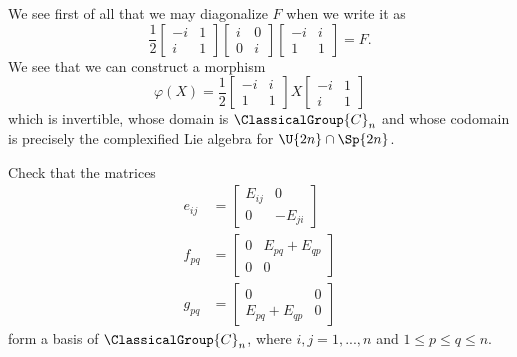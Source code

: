 \answer We see first of all that we may diagonalize $F$ when we
write it as
\begin{equation}
\frac{1}{2}\begin{bmatrix}-i&1\\i&1
\end{bmatrix}
\begin{bmatrix}
i&0\\0&i
\end{bmatrix}
\begin{bmatrix}-i&i\\
1&1
\end{bmatrix}=F.
\end{equation}
We see that we can construct a morphism
\begin{equation}
\varphi(X)=\frac{1}{2}\begin{bmatrix}-i&i\\
1&1
\end{bmatrix}X\begin{bmatrix}-i&1\\i&1
\end{bmatrix}
\end{equation}
which is invertible, whose domain is $\ClassicalGroup{C}_{n}$ and whose codomain
is precisely the complexified Lie algebra for $\U{2n}\cap\Sp{2n}$.

\begin{exercise}\label{hw4:ex6}
Check that the matrices
\begin{subequations}
\begin{align}
e_{ij} &= \begin{bmatrix}E_{ij}&0\\0&-E_{ji}
\end{bmatrix}\\
f_{pq}&= \begin{bmatrix}0&E_{pq}+E_{qp}\\0&0
\end{bmatrix}\\
g_{pq}&=\begin{bmatrix}0&0\\E_{pq}+E_{qp}&0
\end{bmatrix}
\end{align}
\end{subequations}
form a basis of $\ClassicalGroup{C}_{n}$, where $i,j=1,...,n$ and $1\leq p\leq
q\leq n$.
\end{exercise}


